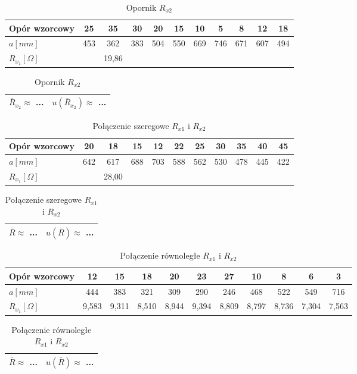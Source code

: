 \documentclass[a4paper,11pt]{article}
\begin{document}
\begin{table}[h!]
\caption{Opornik $R_{x2}$}
\begin{tabular}{|l|c|c|c|c|c|c|c|c|c|c|}\hline
\label{table1}
Opór wzorcowy & 25 & 35 & 30 & 20 & 15 & 10 & 5 & 8 & 12 & 18 \\ \hline
$a [mm]$ & 453 & 362 & 383 & 504 & 550 & 669 & 746 & 671 & 607 & 494 \\ \hline
$R_{x_{1}} [\Omega]$ &  & 19,86 & & & & & & & \\ \hline
\end{tabular}

\begin{tabular}{|l|l|}\hline
$ \overline{R}_{x_{2}} \approx$ ... & $u(\overline{R}_{x_{2}}) \approx$ ...  \\ \hline
\end{tabular}
\end{table}

\begin{table}[h!]
\caption{Połączenie szeregowe $R_{x1}$ i $R_{x2}$}
\begin{tabular}{|l|c|c|c|c|c|c|c|c|c|c|}\hline
\label{table1}
Opór wzorcowy & 20 & 18 & 15 & 12 & 22 & 25 & 30 & 35 & 40 & 45 \\ \hline
$a [mm]$ & 642 & 617 & 688 & 703 & 588 & 562 & 530 & 478 & 445 & 422 \\ \hline
$R_{x_{1}} [\Omega]$ &  & 28,00 & & & & & & & \\ \hline
\end{tabular}

\begin{tabular}{|l|l|}\hline
$ \overline{R} \approx$ ... & $u(\overline{R}) \approx$ ...  \\ \hline
\end{tabular}
\end{table}


\begin{table}[h!]
\caption{Połączenie równoległe $R_{x1}$ i $R_{x2}$}
\begin{tabular}{|l|c|c|c|c|c|c|c|c|c|c|}\hline
\label{table1}
Opór wzorcowy & 12 & 15 & 18 & 20 & 23 & 27 & 10 & 8 & 6 & 3 \\ \hline
$a [mm]$ & 444 & 383 & 321 & 309 & 290 & 246 & 468 & 522 & 549 & 716 \\ \hline
$R_{x_{1}} [\Omega]$ & 9,583 & 9,311 & 8,510 & 8,944 & 9,394 & 8,809 & 8,797 & 8,736 & 7,304 & 7,563\\ \hline
\end{tabular}

\begin{tabular}{|l|l|}\hline
$ \overline{R} \approx$ ... & $u(\overline{R}) \approx$ ...  \\ \hline
\end{tabular}
\end{table}
\end{document}
